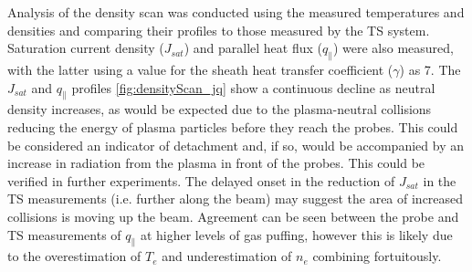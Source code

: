 \documentclass[a4paper, 12pt]{article} %
\begin{document}
	Analysis of the density scan was conducted using the measured temperatures and densities and comparing their profiles to those measured by the TS system. 
	Saturation current density ($J_{sat}$) and parallel heat flux ($q_{\parallel}$) were also measured, with the latter using a value for the sheath heat transfer coefficient ($\gamma$) as 7.
	The $J_{sat}$ and $q_{\parallel}$ profiles \cref{fig:densityScan_jq} show a continuous decline as neutral density increases, as would be expected due to the plasma-neutral collisions reducing the energy of plasma particles before they reach the probes.
	This could be considered an indicator of detachment and, if so, would be accompanied by an increase in radiation from the plasma in front of the probes. 
	This could be verified in further experiments.
	The delayed onset in the reduction of $J_{sat}$ in the TS measurements (i.e. further along the beam) may suggest the area of increased collisions is moving up the beam.
	Agreement can be seen between the probe and TS measurements of $q_{\parallel}$ at higher levels of gas puffing, however this is likely due to the overestimation of $T_e$ and underestimation of $n_e$ combining fortuitously.
	
\end{document}
